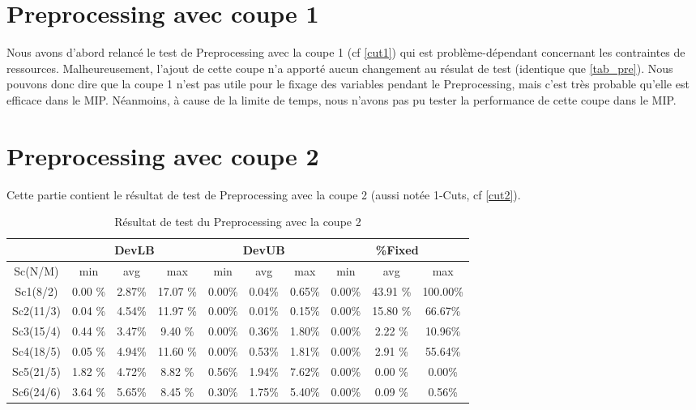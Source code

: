 \documentclass[twoside,fleqn]{EPURapport}
\begin{document}
\section{Preprocessing avec coupe 1}
Nous avons d'abord relancé le test de Preprocessing avec la coupe 1 (cf \ref{cut1}) qui est problème-dépendant concernant les contraintes de ressources. Malheureusement, l'ajout de cette coupe n'a apporté aucun changement au résulat de test (identique que \ref{tab_pre}). Nous pouvons donc dire que la coupe 1 n'est pas utile pour le fixage des variables pendant le Preprocessing, mais c'est très probable qu'elle est efficace dans le MIP. Néanmoins, à cause de la limite de temps, nous n'avons pas pu tester la performance de cette coupe dans le MIP.


\section{Preprocessing avec coupe 2}
Cette partie contient le résultat de test de Preprocessing avec la coupe 2 (aussi notée 1-Cuts, cf \ref{cut2}).
\begin{table}[h]
    \centering
    \begin{tabular}{|c|c|c|c|c|c|c|c|c|c|}
    	\hline
&\multicolumn{3}{c|}{DevLB}& \multicolumn{3}{c|}{DevUB}& \multicolumn{3}{c|}{\%Fixed} 	\\ \hline
    	Sc(N/M)	& min & avg & max & min & avg & max & min & avg & max\\ \hline
Sc1(8/2) & 0.00 \% &	2.87\%  &	17.07	\%  &0.00\% & 0.04\%  &0.65\%  &0.00\%  &43.91	\% &100.00\% \\ \hline
Sc2(11/3)& 0.04 \% & 	4.54\% & 	11.97	\% & 0.00\%&  0.01\% & 0.15\% & 0.00\%  &15.80	\% &66.67\%\\ \hline
Sc3(15/4)& 0.44 \% & 	3.47\% & 	9.40	\% & 0.00\%&  0.36\% & 1.80\% & 0.00\%  &2.22	\% &10.96\%\\ \hline
Sc4(18/5)& 0.05 \% & 	4.94\% & 	11.60	\% & 0.00\%&  0.53\% & 1.81\% & 0.00\%  &2.91	\% &55.64\%\\ \hline
Sc5(21/5)& 1.82 \% & 	4.72\% & 	8.82	\%  &0.56\% & 1.94\%  &7.62\%  &0.00\%  &0.00	\% &0.00\%\\ \hline
Sc6(24/6)& 3.64 \% & 	5.65\% & 	8.45	\%  &0.30\% & 1.75\%  &5.40\%  &0.00\%  &0.09	\% &0.56\%\\ \hline 
    \end{tabular}
    \caption{Résultat de test du Preprocessing avec la coupe 2}
    \label{tab_pre_2}
\end{table}
\bigskip
\end{document}
